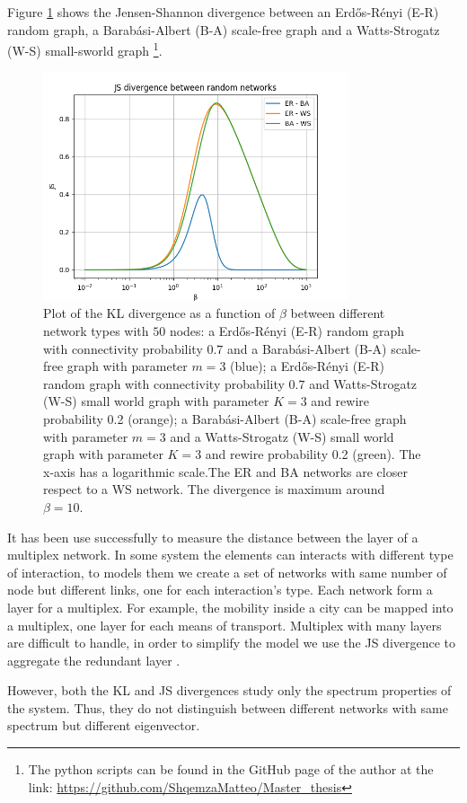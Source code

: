 Figure \ref{Fig:JS_divergence} shows the Jensen-Shannon divergence between an Erd\H{o}s-Rényi (E-R) random graph, a Barab\'asi-Albert (B-A) scale-free graph and a Watts-Strogatz (W-S) small-sworld graph \footnote{The python scripts can be found in the GitHub page of the author at the link: \url{https://github.com/ShqemzaMatteo/Master_thesis}}.

\begin{figure}[ht!]
    \centering
    \includegraphics[width=0.80\textwidth]{image/JS_divergence.png}
    \caption{Plot of the KL divergence as a function of $\beta$ between different network types with $50$ nodes: a Erd\H{o}s-Rényi (E-R) random graph with connectivity probability $0.7$ and a Barab\'asi-Albert (B-A) scale-free graph with parameter $m=3$ (blue); a Erd\H{o}s-Rényi (E-R) random graph with connectivity probability $0.7$ and Watts-Strogatz (W-S) small world graph with parameter $K=3$ and rewire probability 0.2 (orange); a Barab\'asi-Albert (B-A) scale-free graph with parameter $m=3$ and a Watts-Strogatz (W-S) small world graph with parameter $K=3$ and rewire probability 0.2 (green). The x-axis has a logarithmic scale.The ER and BA networks are closer respect to a WS network. The divergence is maximum around $\beta = 10$.}
    \label{Fig:JS_divergence}
\end{figure}
It has been use successfully to measure the distance between the layer of a multiplex network.
In some system the elements can interacts with different type of interaction, to models them we create a set of networks with same number of node but different links, one for each interaction's type. Each network form a layer for a multiplex. For example, the mobility inside a city can be mapped into a multiplex, one layer for each means of transport. Multiplex with many layers are difficult to handle, in order to simplify the model we use the JS divergence to aggregate the redundant layer \cite{multilayer}.

However, both the KL and JS divergences study only the spectrum properties of the system. Thus, they do not distinguish between different networks with same spectrum but different eigenvector.